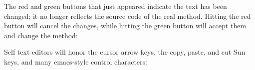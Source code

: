 \documentclass[letterpaper,10pt,english]{sphinxmanual}
\begin{document}
The red and green buttons that just appeared indicate the text has been changed; it no longer reflects
the source code of the real method. Hitting the red button will cancel the changes, while hitting
the green button will accept them and change the method:
\begin{figure}[htbp]\begin{flushleft}

\end{flushleft}\end{figure}

Self text editors will honor the cursor arrow keys, the copy, paste, and cut Sun keys, and
many emacs-style control characters:
\end{document}
